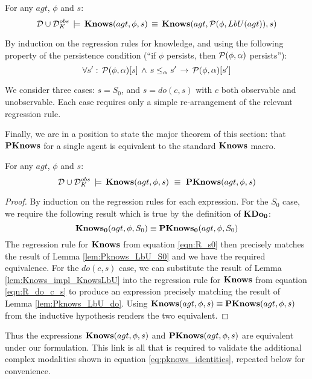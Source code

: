 \begin{lemma}
\label{lem:Knows_impl_KnowsLbU}For any $agt$, $\phi$ and $s$:\[
\mathcal{D}\cup\mathcal{D}_{K}^{obs}\,\models\,\mathbf{Knows}(agt,\phi,s)\,\equiv\,\mathbf{Knows}(agt,\mathcal{P}(\phi,LbU(agt)),s)\]

\end{lemma}
\begin{proofsketch}
By induction on the regression rules for knowledge, and using the
following property of the persistence condition ({}``if $\phi$ persists,
then $\mathcal{P}(\phi,\alpha)$ persists''):\[
\forall s':\,\mathcal{P}(\phi,\alpha)[s]\,\wedge\, s\leq_{\alpha}s'\,\rightarrow\,\mathcal{P}(\phi,\alpha)[s']\]


We consider three cases: $s=S_{0}$, and $s=do(c,s)$ with $c$ both
observable and unobservable. Each case requires only a simple re-arrangement
of the relevant regression rule. 
\end{proofsketch}
\medskip{}


Finally, we are in a position to state the major theorem of this section:
that $\mathbf{PKnows}$ for a single agent is equivalent to the standard $\mathbf{Knows}$
macro.

\begin{thm}
For any $agt$, $\phi$ and $s$:\[
\mathcal{D}\cup\mathcal{D}_{K}^{obs}\,\models\,\mathbf{Knows}(agt,\phi,s)\,\,\equiv\,\,\mathbf{PKnows}(agt,\phi,s)\]

\end{thm}
\begin{proof}
By induction on the regression rules for each expression. For the
$S_{0}$ case, we require the following result which is true by the
definition of $\mathbf{KDo_{0}}$:\[
\mathbf{Knows_{0}}(agt,\phi,S_{0})\equiv\mathbf{PKnows_{0}}(agt,\phi,S_{0})\]
 The regression rule for $\mathbf{Knows}$ from equation \eqref{eqn:R_s0}
then precisely matches the result of Lemma \ref{lem:Pknows_LbU_S0}
and we have the required equivalence. For the $do(c,s)$ case, we
can substitute the result of Lemma \ref{lem:Knows_impl_KnowsLbU}
into the regression rule for $\mathbf{Knows}$ from equation \eqref{eqn:R_do_c_s}
to produce an expression precisely matching the result of Lemma \ref{lem:Pknows_LbU_do}.
Using $\mathbf{Knows}(agt,\phi,s)\equiv\mathbf{PKnows}(agt,\phi,s)$ from the inductive
hypothesis renders the two equivalent. 
\end{proof}
\medskip{}


Thus the expressions $\mathbf{Knows}(agt,\phi,s)$ and $\mathbf{PKnows}(agt,\phi,s)$
are equivalent under our formulation. This link is all that is required
to validate the additional complex modalities shown in equation \eqref{eq:pknows_identities},
repeated below for convenience.

